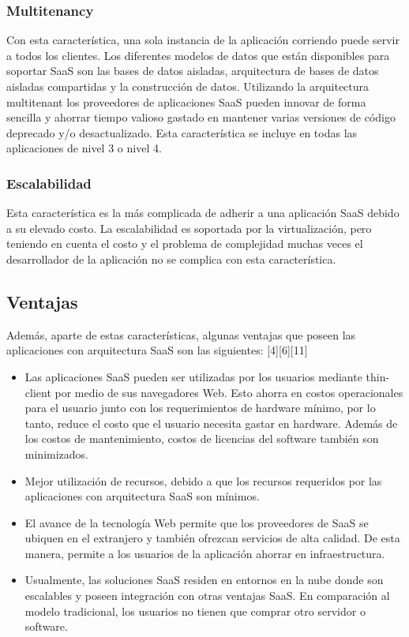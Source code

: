 \subsubsection{Multitenancy}
Con esta característica, una sola instancia de la aplicación corriendo puede servir a todos los clientes. Los diferentes modelos de datos que están disponibles para soportar SaaS son las bases de datos aisladas, arquitectura de bases de datos aisladas compartidas y la construcción de datos. Utilizando la arquitectura multitenant los proveedores de aplicaciones SaaS pueden innovar de forma sencilla y ahorrar tiempo valioso gastado en mantener varias versiones de código deprecado y/o desactualizado. Esta característica se incluye en todas las aplicaciones de nivel 3 o nivel 4.

\subsubsection{Escalabilidad}
Esta característica es la más complicada de adherir a una aplicación SaaS debido a su elevado costo. La escalabilidad es soportada por la virtualización, pero teniendo en cuenta el costo y el problema de complejidad muchas veces el desarrollador de la aplicación no se complica con esta característica.

\subsection{Ventajas}
Además, aparte de estas características, algunas ventajas que poseen las aplicaciones con arquitectura SaaS son las siguientes: [4][6][11]
\begin{itemize}
	\item Las aplicaciones SaaS pueden ser utilizadas por los usuarios mediante thin-client por medio de sus navegadores Web. Esto ahorra en costos operacionales para el usuario junto con los requerimientos de hardware mínimo, por lo tanto, reduce el costo que el usuario necesita gastar en hardware.  Además de los costos de mantenimiento, costos de licencias del software también son minimizados.
	\item Mejor utilización de recursos, debido a que los recursos requeridos por las aplicaciones con arquitectura SaaS son mínimos.
	\item El avance de la tecnología Web permite que los proveedores de SaaS se ubiquen en el extranjero y también ofrezcan servicios de alta calidad. De esta manera, permite a los usuarios de la aplicación ahorrar en infraestructura.
	\item Usualmente, las soluciones SaaS residen en entornos en la nube donde son escalables y poseen integración con otras ventajas SaaS. En comparación al modelo tradicional, los usuarios no tienen que comprar otro servidor o software.
\end{itemize}